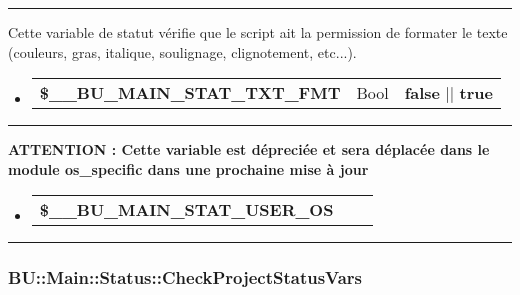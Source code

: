 \documentclass[a4paper,10pt]{article}
\begin{document}

\par\noindent\rule{\textwidth}{0.4pt}

\begin{justify}
    Cette variable de statut vérifie que le script ait la permission de formater le texte (couleurs, gras, italique, soulignage, clignotement, etc...).
\end{justify}

\begin{justify}
     \begin{itemize}
        \item
        {
            \begin{tabular}{l|l|l}
                \textbf{\color{orange}\$\_\_BU\_MAIN\_STAT\_TXT\_FMT}   & Bool & \textbf{false} || \textbf{true}\\[1\baselineskip]
            \end{tabular}
        }
    \end{itemize}
\end{justify}


\par\noindent\rule{\textwidth}{0.4pt}

\begin{justify}
\textbf{ATTENTION : Cette variable est dépreciée et sera déplacée dans le module \textbf{\color{lime}os\_specific} dans une prochaine mise à jour}
\end{justify}

\begin{justify}
     \begin{itemize}
        \item
        {
            \begin{tabular}{l|l|l}
                \textbf{\color{orange}\$\_\_BU\_MAIN\_STAT\_USER\_OS}   & &\\[1\baselineskip]
            \end{tabular}
        }
    \end{itemize}
\end{justify}



\color{blue}\par\noindent\rule{\textwidth}{0.4pt}\color{white}

\color{blue}
\subsubsection{BU::Main::Status::CheckProjectStatusVars}\color{white}
\end{document}
